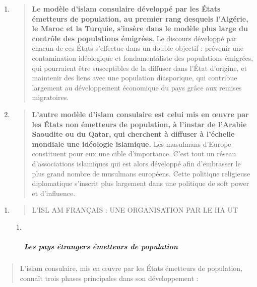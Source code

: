 \begin{enumerate}
\def\labelenumi{\alph{enumi}.}
\item
  \begin{quote}
  \textbf{Le modèle d'islam consulaire développé par les États émetteurs
  de population, au premier rang desquels l'Algérie, le Maroc et la
  Turquie, s'insère dans le modèle plus large du contrôle des
  populations émigrées.} Le discours développé par chacun de ces États
  s'effectue dans un double objectif : prévenir une contamination
  idéologique et fondamentaliste des populations émigrées, qui
  pourraient être susceptibles de la diffuser dans l'État d'origine, et
  maintenir des liens avec une population diasporique, qui contribue
  largement au développement économique du pays grâce aux remises
  migratoires.
  \end{quote}
\item
  \begin{quote}
  \textbf{L'autre modèle d'islam consulaire est celui mis en œuvre par
  les États non émetteurs de population, à l'instar de l'Arabie Saoudite
  ou du Qatar, qui cherchent à diffuser à l'échelle mondiale une
  idéologie islamique.} Les musulmans d'Europe constituent pour eux une
  cible d'importance. C'est tout un réseau d'associations islamiques qui
  est alors développé afin d'embrasser le plus grand nombre de musulmans
  européens. Cette politique religieuse diplomatique s'inscrit plus
  largement dans une politique de soft power et d'influence.
  \end{quote}
\end{enumerate}

\begin{enumerate}
\def\labelenumi{\Roman{enumi}.}
\setcounter{enumi}{1}
\item
  \begin{quote}
  L'ISL AM FRANÇAIS : UNE ORGANISATION PAR LE HA UT
  \end{quote}

  \begin{enumerate}
  \def\labelenumii{\roman{enumii}.}
  \item ~
    \hypertarget{les-pays-uxe9trangers-uxe9metteurs-de-population}{%
    \subparagraph{Les pays étrangers émetteurs de
    population}\label{les-pays-uxe9trangers-uxe9metteurs-de-population}}
  \end{enumerate}
\end{enumerate}

\begin{quote}
L'islam consulaire, mis en œuvre par les États émetteurs de population,
connaît trois phases principales dans son développement :
\end{quote}

